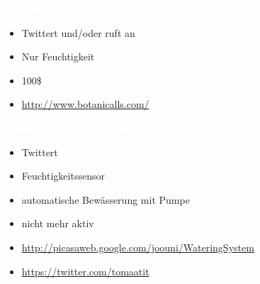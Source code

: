 \documentclass[bigger]{beamer}
\newcommand{\topic}[1]{{\huge{\textcolor{white}{\textbf{#1}}}}}
\begin{document}
\begin{frame}{\topic{Botanicalls}}
	\begin{itemize}
		\item Twittert und/oder ruft an
		\item Nur Feuchtigkeit
		\item 100\$
		\item \url{http://www.botanicalls.com/}
	\end{itemize}
\end{frame}

\begin{frame}{\topic{Tomato Irrigation Project}}
	\begin{itemize}
		\item Twittert
		\item Feuchtigkeitssensor
		\item automatische Bewässerung mit Pumpe
		\item nicht mehr aktiv
		\item \url{http://picasaweb.google.com/joouni/WateringSystem}
		\item \url{https://twitter.com/tomaatit}
	\end{itemize}
\end{frame}
\end{document}
